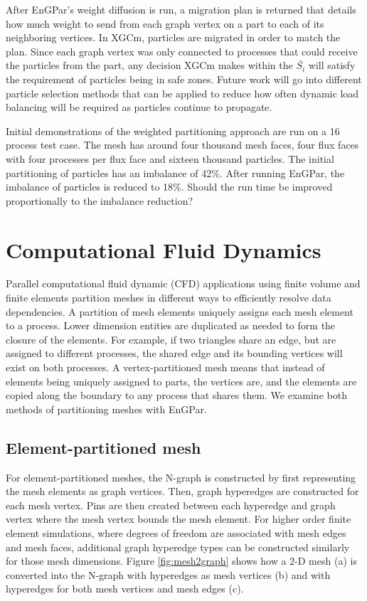 \documentclass[conference]{IEEEtran}
\begin{document}
After EnGPar's weight diffusion is run, a migration plan is returned that details how
much weight to send from each graph vertex on a part to each of its neighboring vertices.
In XGCm, particles are migrated in order to match the plan. Since each graph vertex was only
connected to processes that could receive the particles from the part, any decision XGCm makes
within the $\bar{S_i}$ will satisfy the requirement of particles being in safe zones. Future work
will go into different particle selection methods that can be applied to reduce how often
dynamic load balancing will be required as particles continue to propagate.

Initial demonstrations of the weighted partitioning approach are run on a 16
process test case. The mesh has around four thousand
mesh faces, four flux faces with four processes per flux face and sixteen thousand particles.
The initial partitioning of particles has an imbalance of 42\%. After running EnGPar, the
imbalance of particles is reduced to 18\%. {\color{red} Should the run time be
improved proportionally to the imbalance reduction?}

\section{Computational Fluid Dynamics}

Parallel computational fluid dynamic (CFD) applications using
finite volume and finite elements partition meshes in different
ways to efficiently resolve data dependencies.
A partition of mesh elements uniquely assigns each mesh element to a process.
Lower dimension entities are duplicated as needed to form the closure of the
elements.
For example, if two triangles share an edge, but are assigned to different
processes, the shared edge and its bounding vertices will exist on both
processes.
A vertex-partitioned mesh means that
instead of elements being uniquely assigned to parts, the vertices are, and the elements are
copied along the boundary to any process that shares them. We examine both methods of
partitioning meshes with EnGPar.

\subsection{Element-partitioned mesh}

For element-partitioned meshes, the N-graph is constructed by first representing the mesh elements
as graph vertices. Then, graph hyperedges are constructed for each mesh vertex. Pins
are then created between each hyperedge and graph vertex where the mesh vertex bounds the
mesh element. For higher order finite element simulations, where degrees of freedom are
associated with mesh edges and mesh faces, additional graph hyperedge types can be constructed
similarly for those mesh dimensions. Figure \ref{fig:mesh2graph} shows how a 2-D mesh (a)
is converted into the N-graph with hyperedges as mesh vertices (b) and with hyperedges for
both mesh vertices and mesh edges (c).
\end{document}
